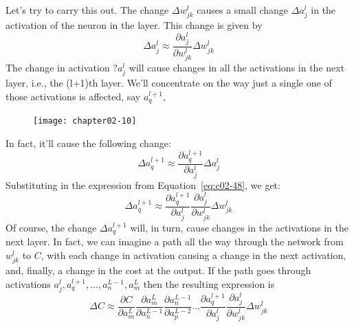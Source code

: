 Let's try to carry this out. The change $\Delta w^l_{jk}$ causes a small change $\Delta a^l_j$ in the activation of the  neuron in the  layer. This change is given by 
\begin{equation}
\Delta a_{j}^{l} \approx \frac{\partial a_{j}^{l}}{\partial w_{j k}^{l}} \Delta w_{j k}^{l}
\label{eq:c02-48}
\end{equation}
The change in activation ?$a^l_j$ will cause changes in all the activations in the next layer, i.e., the (l+1)th layer. We'll concentrate on the way just a single one of those activations is affected, say $a^{l+1}_q$,


\begin{figure}
\texttt{[image: chapter02-10]}
\end{figure}

In fact, it'll cause the following change: 
\begin{equation}
\Delta a_{q}^{l+1} \approx \frac{\partial a_{q}^{l+1}}{\partial a_{j}^{l}} \Delta a_{j}^{l}
\label{eq:c02-49}
\end{equation}
Substituting in the expression from Equation~\ref{eq:c02-48}, we get: 
\begin{equation}
\Delta a_{q}^{l+1} \approx \frac{\partial a_{q}^{l+1}}{\partial a_{j}^{l}} \frac{\partial a_{j}^{l}}{\partial w_{j k}^{l}} \Delta w_{j k}^{l}
\label{eq:c02-50}
\end{equation}
Of course, the change $\Delta a^{l+1}_q$ will, in turn, cause changes in the activations in the next layer. In fact, we can imagine a path all the way through the network from $w^l_{jk}$ to $C$, with each change in activation causing a change in the next activation, and, finally, a change in the cost at the output. If the path goes through activations $a_{j}^{l}, a_{q}^{l+1}, \ldots, a_{n}^{L-1}, a_{m}^{L}$ then the resulting expression is 
\begin{equation}
\Delta C \approx \frac{\partial C}{\partial a_{m}^{L}} \frac{\partial a_{m}^{L}}{\partial a_{n}^{L-1}} \frac{\partial a_{n}^{L-1}}{\partial a_{p}^{L-2}} \ldots \frac{\partial a_{q}^{l+1}}{\partial a_{j}^{l}} \frac{\partial a_{j}^{l}}{\partial w_{j k}^{l}} \Delta w_{j k}^{l}
\label{eq:c02-51}
\end{equation}


